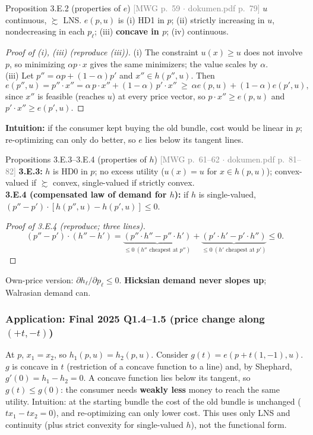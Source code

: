 \documentclass[11pt]{article}
\newcommand{\pref}{\succsim}
\newcommand{\mwg}[2]{\hfill{\small\textcolor{gray}{[MWG p.~#1 $\cdot$ dokumen.pdf p.~#2]}}}
\begin{document}
\begin{prop}{Proposition 3.E.2 (properties of $e$) \mwg{59}{79}}
$u$ continuous, $\pref$ LNS. $e(p,u)$ is (i) HD1 in $p$; (ii) strictly increasing in $u$, nondecreasing in each $p_\ell$; (iii) \textbf{concave in $p$}; (iv) continuous.
\end{prop}
\begin{proof}[Proof of (i), (iii) (reproduce (iii))]
(i) The constraint $u(x)\ge u$ does not involve $p$, so minimizing $\alpha p\cdot x$ gives the same minimizers; the value scales by $\alpha$.\\
(iii) Let $p''=\alpha p+(1-\alpha)p'$ and $x''\in h(p'',u)$. Then
\[
e(p'',u)=p''\cdot x''=\alpha\,p\cdot x''+(1-\alpha)\,p'\cdot x''\ \ge\ \alpha e(p,u)+(1-\alpha)e(p',u),
\]
since $x''$ is feasible (reaches $u$) at every price vector, so $p\cdot x''\ge e(p,u)$ and $p'\cdot x''\ge e(p',u)$.
\end{proof}
\textbf{Intuition:} if the consumer kept buying the old bundle, cost would be linear in $p$; re-optimizing can only do better, so $e$ lies below its tangent lines.

\begin{prop}{Propositions 3.E.3--3.E.4 (properties of $h$) \mwg{61--62}{81--82}}
\textbf{3.E.3:} $h$ is HD0 in $p$; no excess utility ($u(x)=u$ for $x\in h(p,u)$); convex-valued if $\pref$ convex, single-valued if strictly convex.\\
\textbf{3.E.4 (compensated law of demand for $h$):} if $h$ is single-valued, $(p''-p')\cdot[h(p'',u)-h(p',u)]\le0$.
\end{prop}
\begin{proof}[Proof of 3.E.4 (reproduce; three lines)]
\[(p''-p')\cdot(h''-h')=\underbrace{(p''\cdot h''-p''\cdot h')}_{\le0\ (h''\text{ cheapest at }p'')}+\underbrace{(p'\cdot h'-p'\cdot h'')}_{\le0\ (h'\text{ cheapest at }p')}\le0.\]
\end{proof}
Own-price version: $\partial h_\ell/\partial p_\ell\le0$. \textbf{Hicksian demand never slopes up}; Walrasian demand can.

\subsubsection{Application: Final 2025 Q1.4--1.5 (price change along $(+t,-t)$)}\label{sec:app-e}
At $p$, $x_1=x_2$, so $h_1(p,u)=h_2(p,u)$. Consider $g(t)=e(p+t(1,-1),u)$. $g$ is concave in $t$ (restriction of a concave function to a line) and, by Shephard, $g'(0)=h_1-h_2=0$. A concave function lies below its tangent, so $g(t)\le g(0)$: the consumer needs \textbf{weakly less} money to reach the same utility. Intuition: at the starting bundle the cost of the old bundle is unchanged ($t x_1-t x_2=0$), and re-optimizing can only lower cost. This uses only LNS and continuity (plus strict convexity for single-valued $h$), not the functional form.
\end{document}
